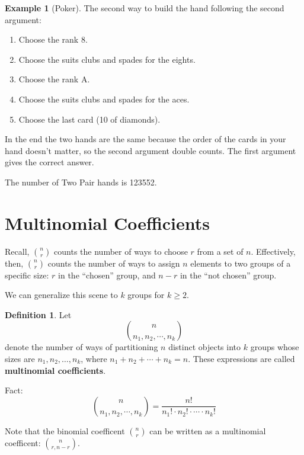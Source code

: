 \documentclass[
]{book}
\providecommand{\tightlist}{%
  \setlength{\itemsep}{0pt}\setlength{\parskip}{0pt}}
\theoremstyle{definition}
\newtheorem{definition}{Definition}[chapter]
\theoremstyle{definition}
\newtheorem{example}{Example}[chapter]
\theoremstyle{definition}
\theoremstyle{definition}
\theoremstyle{remark}
\begin{document}
\begin{example}[Poker]
The second way to build the hand following the second argument:

\begin{enumerate}
\def\labelenumi{\arabic{enumi}.}
\tightlist
\item
  Choose the rank 8.
\item
  Choose the suits clubs and spades for the eights.
\item
  Choose the rank A.
\item
  Choose the suits clubs and spades for the aces.
\item
  Choose the last card (10 of diamonds).
\end{enumerate}

In the end the two hands are the same because the order of the cards in your hand doesn't matter, so the second argument double counts. The first argument gives the correct answer.

The number of Two Pair hands is 123552.
\end{example}

\section{Multinomial Coefficients}\label{multinomial-coefficients}

Recall, \(\binom{n}{r}\) counts the number of ways to choose \(r\) from a set of \(n\). Effectively, then, \(\binom{n}{r}\) counts the number of ways to assign \(n\) elements to two groups of a specific size: \(r\) in the ``chosen'' group, and \(n-r\) in the ``not chosen'' group.

We can generalize this scene to \(k\) groups for \(k \geq 2\).

\begin{definition}
\protect\hypertarget{def:multinomial-coefficients}{}\label{def:multinomial-coefficients}Let
\[\binom{n}{n_1, n_2, \cdots, n_k}\] denote the number of ways of partitioning \(n\) distinct objects into \(k\) groups whose sizes are \(n_1, n_2, \ldots, n_k\), where \(n_1 + n_2 + \cdots + n_k = n\). These expressions are called \textbf{multinomial coefficients}.
\end{definition}

Fact:
\begin{equation} 
  \binom{n}{n_1, n_2, \cdots, n_k} = \frac{n!}{n_1! \cdot n_2! \cdot \cdots \cdot n_k!}
  \label{eq:multinomial}
\end{equation}

Note that the binomial coefficent \(\displaystyle \binom{n}{r}\) can be written as a multinomial coefficent: \(\displaystyle \binom{n}{r, n-r}\).
\end{document}
